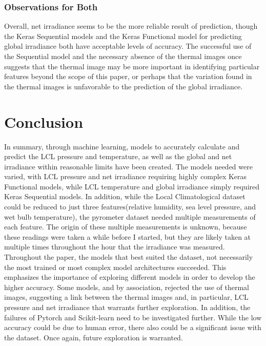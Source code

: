 \documentclass[conference]{IEEEtran}
\begin{document}
\subsubsection{Observations for Both}
Overall, net irradiance seems to be the more reliable result of prediction, though the Keras Sequential models and the Keras Functional model for predicting global irradiance both have acceptable levels of accuracy. The successful use of the Sequential model and the necessary absence of the thermal images once suggests that the thermal image may be more important in identifying particular features beyond the scope of this paper, or perhaps that the variation found in the thermal images is 
unfavorable to the prediction of the global irradiance.  

\section{Conclusion}
In summary, through machine learning, models to accurately calculate and predict the LCL pressure and temperature, as well as the global and net irradiance within reasonable limits have been created. The models needed were varied, with LCL pressure and net irradiance requiring highly complex Keras Functional models, while LCL temperature and global irradiance simply required Keras Sequential models. In addition, while the Local Climatological dataset could be reduced to just three features(relative humidity, sea level pressure, and wet bulb temperature), the pyrometer dataset needed multiple measurements of each feature. The origin of these multiple measurements is unknown, because these readings were taken a while before I started, but they are likely taken at multiple times throughout the hour that the irradiance was measured. Throughout the paper, the models that best suited the dataset, not necessarily the most trained or most complex model architectures succeeded. This emphasizes the importance of exploring different models in order to develop the higher accuracy. Some models, and by association, rejected the use of thermal images, suggesting a link between the thermal images and, in particular, LCL pressure and net irradiance that warrants further exploration. In addition, the failures of Pytorch and Scikit-learn need to be investigated further. While the low accuracy could be due to human error, there also could be a significant issue with the dataset. Once again, future exploration is warranted. 
\end{document}
